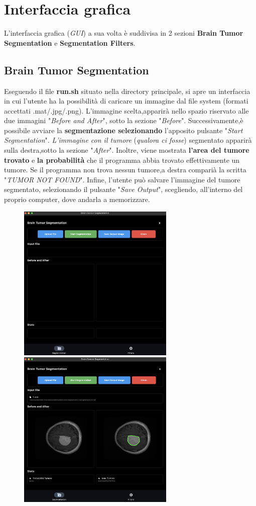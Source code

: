 \documentclass{article}
\begin{document}
\section{Interfaccia grafica }
L'interfaccia grafica (\textit{GUI}) a sua volta è suddivisa in 2 sezioni \textbf{Brain Tumor Segmentation} e \textbf{Segmentation Filters}.

\subsection{Brain Tumor Segmentation}
Eseguendo il file \textbf{run.sh} situato nella directory principale, si apre un interfaccia in cui l'utente ha la possibilità 
di caricare un immagine dal file system (formati accettati .mat/.jpg/.png).
L'immagine scelta,apparirà nello spazio riservato alle due immagini "\textit{Before and After}", sotto la sezione "\textit{Before}".
Successivamente,è possibile avviare la \textbf{segmentazione selezionando} l'apposito pulsante "\textit{Start Segmentation}".
\textit{L'immagine con il tumore} (\textit{qualora ci fosse}) segmentato apparirà sulla destra,sotto la sezione "\textit{After}".
Inoltre, viene mostrata \textbf{l'area del tumore trovato} e \textbf{la probabilità} che il programma abbia trovato effettivamente 
un tumore.
Se il programma non trova nessun tumore,a destra comparià la scritta "\textit{TUMOR NOT FOUND}".
Infine, l'utente può salvare l'immagine del tumore segmentato, selezionando il pulsante "\textit{Save Output}", scegliendo, 
all'interno del proprio computer, dove andarla a memorizzare.
\begin{figure}[H]
    \centering
    \includegraphics[width=7.5cm]{images/before.png}
    \includegraphics[width=7.5cm]{images/after.png}
\end{figure}
\end{document}
